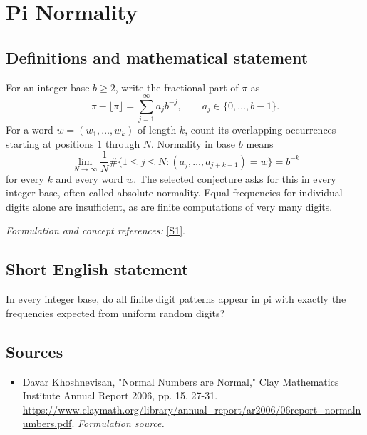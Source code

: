 \documentclass[11pt]{article}
\begin{document}
\section*{\texorpdfstring{Pi Normality}{Pi Normality}}\label{1502}
\subsection{Definitions and mathematical statement}
For an integer base $b\ge2$, write the fractional part of $\pi$ as
\[
 \pi-\lfloor\pi\rfloor=\sum_{j=1}^{\infty}a_jb^{-j},
 \qquad a_j\in\{0,\ldots,b-1\}.
\]
For a word $w=(w_1,\ldots,w_k)$ of length $k$, count its overlapping occurrences starting at positions $1$ through $N$. Normality in base $b$ means
\[
 \lim_{N\to\infty}\frac1N
 \#\{1\le j\le N:(a_j,\ldots,a_{j+k-1})=w\}=b^{-k}
\]
for every $k$ and every word $w$. The selected conjecture asks for this in every integer base, often called absolute normality. Equal frequencies for individual digits alone are insufficient, as are finite computations of very many digits.
\par\smallskip\textit{Formulation and concept references:} \href{https://www.claymath.org/library/annual_report/ar2006/06report_normalnumbers.pdf}{[S1]}.

\subsection{Short English statement}
In every integer base, do all finite digit patterns appear in pi with exactly the frequencies expected from uniform random digits?
\subsection{Sources}
\begin{itemize}
\item[S1]Davar Khoshnevisan, "Normal Numbers are Normal," Clay Mathematics Institute Annual Report 2006, pp. 15, 27-31.
\url{https://www.claymath.org/library/annual_report/ar2006/06report_normalnumbers.pdf}.
\textit{Formulation source.}
\end{itemize}
\end{document}
